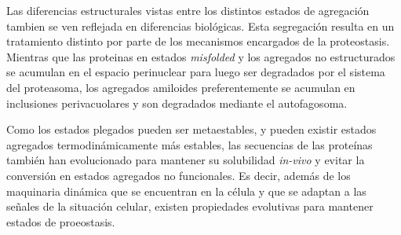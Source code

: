 Las diferencias estructurales vistas entre los distintos estados de agregación tambien se ven reflejada en diferencias biológicas. 
Esta segregación resulta en un tratamiento distinto por parte de los mecanismos encargados de la proteostasis.
Mientras que las proteinas en estados \textit{misfolded} y los agregados no estructurados se acumulan en el espacio perinuclear para luego ser degradados por el sistema del proteasoma,
los agregados amiloides preferentemente se acumulan en inclusiones perivacuolares y son degradados mediante el autofagosoma.




Como los estados plegados pueden ser metaestables, y pueden existir estados agregados termodinámicamente más estables, las secuencias de las proteínas también han evolucionado para mantener su solubilidad \textit{in-vivo}
y evitar la conversión en estados agregados no funcionales.
Es decir, además de los maquinaria dinámica que se encuentran en la célula y que se adaptan a las señales de la situación celular, existen propiedades evolutivas para mantener estados de proeostasis.

